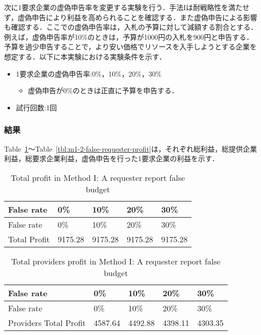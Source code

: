 次に1要求企業の虚偽申告率を変更する実験を行う．手法Iは耐戦略性を満たせず，虚偽申告により利益を高められることを確認する．また虚偽申告による影響も確認する．ここでの虚偽申告率は，入札の予算に対して減額する割合とする．例えば，虚偽申告率が10\%のときは，予算が1000円の入札を900円と申告する．予算を過少申告することで，より安い価格でリソースを入手しようとする企業を想定する．以下に本実験における実験条件を示す．

\begin{itemize}
\tightlist
\item
  1要求企業の虚偽申告率:0\%，10\%，20\%，30\%

  \begin{itemize}
  \tightlist
  \item
    虚偽申告が0\%のときは正直に予算を申告する．
  \end{itemize}
\item
  試行回数:1回
\end{itemize}

\hypertarget{ux7d50ux679c}{%
\subsubsection{結果}\label{ux7d50ux679c}}

Table~\ref{tbl:m1-2-total-profit}〜Table~\ref{tbl:m1-2-false-requester-profit}は，それぞれ総利益，総提供企業利益，総要求企業利益，虚偽申告を行った1要求企業の利益を示す．

\hypertarget{tbl:m1-2-total-profit}{}
\begin{longtable}[H]{@{}lllll@{}}
\caption{\label{tbl:m1-2-total-profit}Total profit in Method I: A
requester report false budget}\tabularnewline
\toprule
False rate & 0\% & 10\% & 20\% & 30\%\tabularnewline
\midrule
\endfirsthead
\toprule
False rate & 0\% & 10\% & 20\% & 30\%\tabularnewline
\midrule
\endhead
Total Profit & 9175.28 & 9175.28 & 9175.28 & 9175.28\tabularnewline
\bottomrule
\end{longtable}

\hypertarget{tbl:m1-2-providers-total-profit}{}
\begin{longtable}[H]{@{}lllll@{}}
\caption{\label{tbl:m1-2-providers-total-profit}Total providers profit
in Method I: A requester report false budget}\tabularnewline
\toprule
False rate & 0\% & 10\% & 20\% & 30\%\tabularnewline
\midrule
\endfirsthead
\toprule
False rate & 0\% & 10\% & 20\% & 30\%\tabularnewline
\midrule
\endhead
Providers Total Profit & 4587.64 & 4492.88 & 4398.11 &
4303.35\tabularnewline
\bottomrule
\end{longtable}

